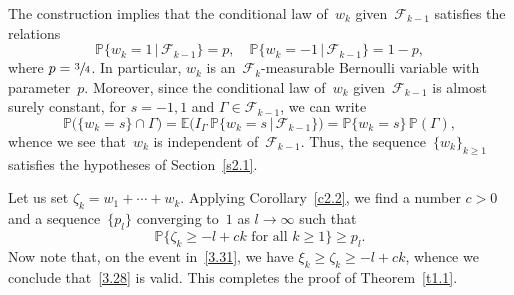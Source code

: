 \documentclass[11pt]{article}
\theoremstyle{plain}
\theoremstyle{definition}
\let\mathcal\mathscr
\theoremstyle{plain}
\numberwithin{equation}{section}
\newcommand{\IP}{{\mathbb P}}
\newcommand{\E}{{\mathbb E}}
\newcommand{\FF}{{\mathcal F}}
\begin{document}
The construction implies that the conditional law of~$w_k$ given~$\FF_{k-1}$ satisfies the relations
\begin{equation} \label{2.1}
\IP\{w_k=1\,|\,\FF_{k-1}\}=p, \quad \IP\{w_k=-1\,|\,\FF_{k-1}\}=1-p,
\end{equation}
where $p=\sfrac34$. In particular, $w_k$ is an~$\FF_k$-measurable Bernoulli variable with parameter~$p$. Moreover, since the conditional law of~$w_k$ given~$\FF_{k-1}$ is almost surely constant, for $s=-1,1$ and $\Gamma\in\FF_{k-1}$, we can write
\[
\IP\bigl(\{w_k=s\}\cap \Gamma\bigr)
=\E\bigl(I_\Gamma\,\IP\{w_k=s\,|\,\FF_{k-1}\}\bigr)=\IP\{w_k=s\}\,\IP(\Gamma),
\]
whence we see that~$w_k$ is independent of~$\FF_{k-1}$. Thus, the sequence~$\{w_k\}_{k\ge1}$ satisfies the hypotheses of Section~\ref{s2.1}.

Let us set $\zeta_k=w_1+\cdots+w_k$. Applying Corollary~\ref{c2.2}, we find a number $c>0$ and a sequence~$\{p_l\}$ converging to~$1$ as $l\to\infty$ such that
\begin{equation} \label{3.31}
\IP\{\zeta_k\ge -l+ck\text{ for all $k\ge1$}\} \ge p_l.
\end{equation}
Now note that, on the event in~\eqref{3.31}, we have $\xi_k\ge\zeta_k\ge -l+ck$, whence we conclude that~\eqref{3.28} is valid. This completes the proof of Theorem~\ref{t1.1}.
\end{document}
